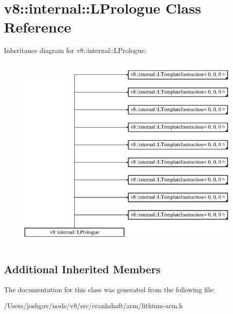 \hypertarget{classv8_1_1internal_1_1_l_prologue}{}\section{v8\+:\+:internal\+:\+:L\+Prologue Class Reference}
\label{classv8_1_1internal_1_1_l_prologue}
Inheritance diagram for v8\+:\+:internal\+:\+:L\+Prologue\+:\begin{figure}[H]
\begin{center}
\leavevmode
\includegraphics[height=10.000000cm]{classv8_1_1internal_1_1_l_prologue}
\end{center}
\end{figure}
\subsection*{Additional Inherited Members}


The documentation for this class was generated from the following file\+:\begin{DoxyCompactItemize}
\item 
/\+Users/joshgav/node/v8/src/crankshaft/arm/lithium-\/arm.\+h\end{DoxyCompactItemize}
